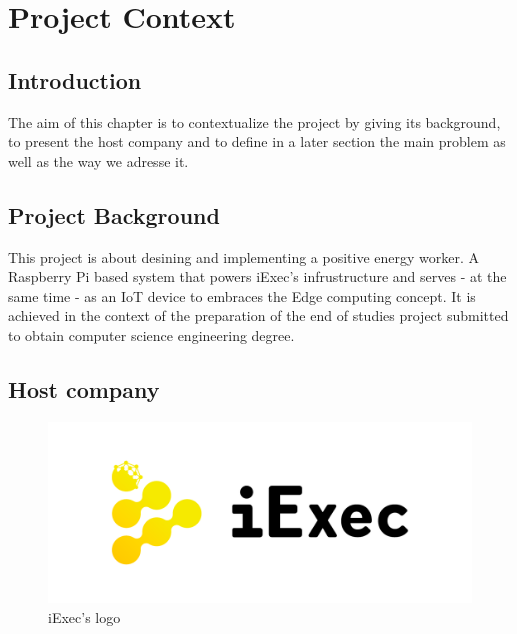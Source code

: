 
\chapter{Project Context}

\section{Introduction}
  The aim of this chapter is to contextualize the project by giving its background,
  to present the host company and to define in a later section the main problem as well
  as the way we adresse it.

\section{Project Background}
  This project is about desining and implementing a positive energy worker.
  A Raspberry Pi based system that powers iExec's infrustructure and serves - at the same
  time - as an IoT device to embraces the Edge computing concept.
  It is achieved in the context of the preparation of the end of studies project submitted to
  obtain computer science engineering degree.

\section{Host company}

  \begin{figure}[!h]\centering
    \includegraphics[width=.5\columnwidth]{2.0-Context/figs/iExec-logo.pdf}
    \caption{iExec's logo}
  \end{figure}


